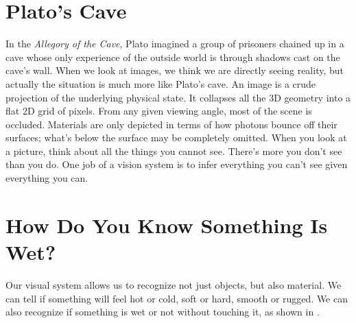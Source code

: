\section{Plato's Cave}


In the \textit{Allegory of the Cave}, Plato imagined a group of prisoners
chained up in a cave whose only experience of the outside world is through shadows cast on the cave's wall.
When we look at images, we think we are directly seeing reality, but actually the situation is much more like Plato's cave. An image is a crude projection of the underlying physical state. It collapses all the 3D geometry into a flat 2D grid of pixels. From any given viewing angle, most of the scene is occluded. Materials are only depicted in terms of how photons bounce off their surfaces; what's below the surface may be completely omitted. When you look at a picture, think about all the things you cannot see. There's more you don't see than you do. One job of a vision system is to infer everything you can't see given everything you can.


\section{How Do You Know Something Is Wet?}

Our visual system allows us to recognize not just objects, but also material. We can tell if something will feel hot or cold, soft or hard, smooth or rugged. We can also recognize if something is wet or not without touching it, as shown in \fig{\ref{fig:wet_sand}}.



